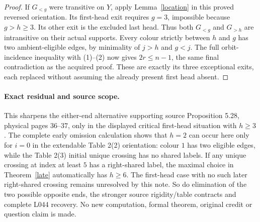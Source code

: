 \documentclass[11pt,a4paper]{article}
\begin{document}
\begin{proof}
If $G_{<g}$ were transitive on $Y$, apply Lemma~\ref{location}
in this proved reversed orientation. Its first-head exit requires
$g=3$, impossible because $g>h\ge3$. Its other exit is the
excluded last head. Thus both $G_{<g}$ and $G_{>h}$ are
intransitive on their actual supports.
Every colour strictly between $h$ and $g$ has two ambient-eligible
edges, by minimality of $j>h$ and $g<j$. The full orbit-incidence
inequality with (1)--(2) now gives $2r\le n-1$, the same final
contradiction as the acquired proof. These are exactly its three
exceptional exits, each replaced without assuming the already
present first head absent.
\end{proof}

\paragraph{Exact residual and source scope.}
This sharpens the either-end alternative supporting source
Proposition 5.28, physical pages 36--37, only in the displayed
critical first-head situation with $h\ge3$.
The complete early omission calculation shows that $h=2$ can occur
here only for $i=0$ in the extendable Table 2(2) orientation:
colour $1$ has two eligible edges, while the Table 2(3) initial
unique crossing has no shared labels. If any unique crossing at
index at least $5$ has a right-shared label, the maximal choice
in Theorem~\ref{late} automatically has $h\ge6$.
The first-head case with no such later right-shared crossing remains
unresolved by this note. So do elimination of the two possible
opposite ends, the stronger source rigidity/table contracts and
complete L044 recovery. No new computation, formal theorem,
original credit or question claim is made.
\end{document}
